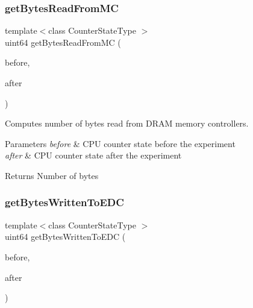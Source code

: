 \subsubsection{\texorpdfstring{get\+Bytes\+Read\+From\+MC}{getBytesReadFromMC}}
{\footnotesize\ttfamily template$<$class Counter\+State\+Type $>$ \\
uint64 get\+Bytes\+Read\+From\+MC (\begin{DoxyParamCaption}\item[{const Counter\+State\+Type \&}]{before,  }\item[{const Counter\+State\+Type \&}]{after }\end{DoxyParamCaption})\hspace{0.3cm}{\ttfamily [friend]}}



Computes number of bytes read from D\+R\+AM memory controllers. 


\begin{DoxyParams}{Parameters}
{\em before} & C\+PU counter state before the experiment \\
\hline
{\em after} & C\+PU counter state after the experiment \\
\hline
\end{DoxyParams}
\begin{DoxyReturn}{Returns}
Number of bytes 
\end{DoxyReturn}
\mbox{\label{class_uncore_counter_state_aface6421f7c3e654bcf411abd7cea990}} 
\subsubsection{\texorpdfstring{get\+Bytes\+Written\+To\+E\+DC}{getBytesWrittenToEDC}}
{\footnotesize\ttfamily template$<$class Counter\+State\+Type $>$ \\
uint64 get\+Bytes\+Written\+To\+E\+DC (\begin{DoxyParamCaption}\item[{const Counter\+State\+Type \&}]{before,  }\item[{const Counter\+State\+Type \&}]{after }\end{DoxyParamCaption})\hspace{0.3cm}{\ttfamily [friend]}}



